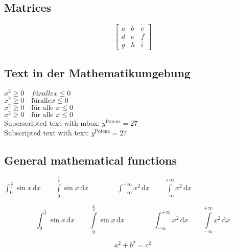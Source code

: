 \documentclass[10pt, a4paper]{article}
\numberwithin{equation}{section}
\numberwithin{figure}{section}
\begin{document}
\subsection{Matrices}

\begin{equation}
\begin{bmatrix}
  a & b & c \\
  d & e & f \\
  g & h & i
 \end{bmatrix}
\end{equation}

\subsection{Text in der Mathematikumgebung}
\( x^2 \geq 0\quad für alle x \leq 0 \)\\ %
\( x^2 \geq 0\quad \mathrm{für alle } x \leq 0 \)\\ %
\( x^2 \geq 0\quad \mbox{für alle } x \leq 0 \)\\ %
\( x^2 \geq 0\quad \text{für alle } x \leq 0 \)\\ %
Superscripted text with mbox: \quad \( y^{\mbox{Potenz}}=27\)\\
Subscripted text with text: \quad \( y^{\text{Potenz}}=27\)

\subsection{General mathematical functions}

\( \int_{0}^{\frac{\pi}{2}} \sin x\,\mathrm{d}x \qquad
\int\limits_{0}^{\frac{\pi}{2}} \sin x\,\mathrm{d}x \qquad\qquad
\int_{-\infty}^{+\infty}x^2\,\mathrm{d}x \qquad
\int\limits_{-\infty}^{+\infty}x^2\,\mathrm{d}x\)

\[ \int_{0}^{\frac{\pi}{2}} \sin x\,\mathrm{d}x \qquad
\int\limits_{0}^{\frac{\pi}{2}} \sin x\,\mathrm{d}x \qquad\qquad
\int_{-\infty}^{+\infty}x^2\,\mathrm{d}x \qquad
\int\limits_{-\infty}^{+\infty}x^2\,\mathrm{d}x\]



\begin{equation}
 	a^2 + b^2 = c^2\label{eq:a}
\end{equation}
\end{document}

